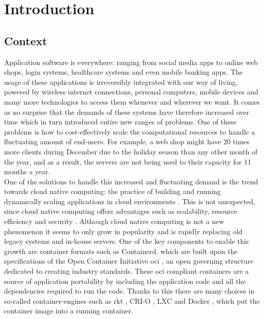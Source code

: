 \chapter{Introduction}                                 \label{ch:introduction}
\section{Context}  \label{sec:context}
Application software is everywhere: ranging from social media apps to online web shops, login systems, healthcare systems and even mobile banking apps. The usage of these applications is irreversibly integrated with our way of living, powered by wireless internet connections, personal computers, mobile devices and many more technologies to access them whenever and wherever we want. It comes as no surprise that the demands of these systems have therefore increased over time which in turn introduced entire new ranges of problems. One of these problems is how to cost-effectively scale the computational resources to handle a fluctuating amount of end-users. For example, a web shop might have 20 times more clients during December due to the holiday season than any other month of the year, and as a result, the servers are not being used to their capacity for 11 months a year.
\\[10pt]

 One of the solutions to handle this increased and fluctuating demand is the trend towards cloud native computing: the practice of building and running dynamically scaling applications in cloud environments \cite{CNCF}. This is not unexpected, since cloud native computing offers advantages such as scalability, resource efficiency and security \cite{cnci4}. Although cloud native computing is not a new phenomenon it seems to only grow in popularity \cite{CNCFSurvey} and is rapidly replacing old legacy systems and in-house servers. One of the key components to enable this growth are container formats such as Containerd, which are built upon the specifications of the Open Container Initiative \acrshort{oci} \cite{OCI}, an open governing structure dedicated to creating industry standards. These \acrshort{oci} compliant containers are a source of application portability by including the application code and all the dependencies required to run the code. Thanks to this there are many choices in so-called container-engines such as rkt \cite{rkt}, CRI-O \cite{crio}, LXC \cite{LXC} and Docker \cite{Bernstein2014}, which put the container image into a running container. 
\\[10pt]

